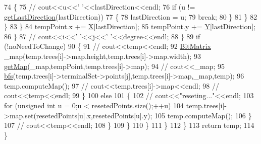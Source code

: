 \begin{DoxyCode}
74                                         \{
75                                             \textcolor{comment}{// cout<<u<<' '<<lastDirection<<endl;}
76                                             \textcolor{keywordflow}{if} (u != \hyperlink{classCleverOptimize_ac1cf58abb7c91bbabffde680d06226af}{getLastDirection}(lastDirection))
77                                             \{
78                                                 lastDirection = u;
79                                                 \textcolor{keywordflow}{break};
80                                             \}
81                                         \}
82                                     \}
83                                 \}
84                                 tempPoint.x += \hyperlink{CleverOptimizie_8cpp_a34adaf40bb2f109e151ba28ccc73c677}{X}[lastDirection];
85                                 tempPoint.y += \hyperlink{CleverOptimizie_8cpp_a86f15c23d2ab23bfebe784c368885663}{Y}[lastDirection];
86                             \}
87                             \textcolor{comment}{// cout<<i<<' '<<j<<' '<<degree<<endl;}
88                         \}
89                         \textcolor{keywordflow}{if} (!noNeedToChange)
90                         \{
91                             \textcolor{comment}{// cout<<temp<<endl;}
92                             \hyperlink{classBitMatrix}{BitMatrix} \_map(temp.trees[i]->map.height,temp.trees[i]->map.width);
93                             \hyperlink{classCleverOptimize_a616cb7ecce678bca75c693230c7415ce}{getMap}(\_map,tempPoint,temp.trees[i]->map);
94                             \textcolor{comment}{// cout<<\_map;}
95                             \hyperlink{classCleverOptimize_a4b53de9bec3e3bbfd176ab68562a0df6}{bfs}(temp.trees[i]->terminalSet->points[j],temp.trees[i]->map,\_map,temp);
96                             temp.computeMap();
97                             \textcolor{comment}{// cout<<temp.trees[i]->map<<endl;}
98                             \textcolor{comment}{// cout<<temp<<endl;}
99                         \}
100                         \textcolor{keywordflow}{else}
101                         \{
102                             \textcolor{comment}{// cout<<"reseting..."<<endl;}
103                             \textcolor{keywordflow}{for} (\textcolor{keywordtype}{unsigned} \textcolor{keywordtype}{int} u = 0;u < resetedPoints.size();++u)
104                                 temp.trees[i]->map.set(resetedPoints[u].x,resetedPoints[u].y);
105                             temp.computeMap();
106                         \}
107                         \textcolor{comment}{// cout<<temp<<endl;}
108                     \}
109                 \}
110             \}   
111         \}
112     \}
113     \textcolor{keywordflow}{return} temp;
114 \}
\end{DoxyCode}


